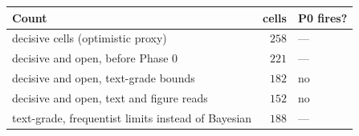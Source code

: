 \begin{tabular}{lrl}
\toprule
Count & cells & P0 fires? \\
\midrule
decisive cells (optimistic proxy) & $258$ & --- \\
decisive and open, before Phase 0 & $221$ & --- \\
decisive and open, text-grade bounds & $182$ & no \\
decisive and open, text and figure reads & $152$ & no \\
text-grade, frequentist limits instead of Bayesian & $188$ & --- \\
\bottomrule
\end{tabular}
